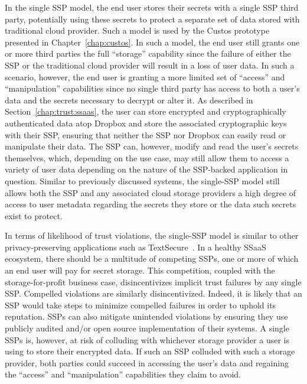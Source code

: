 In the single SSP model, the end user stores their secrets with a
single SSP third party, potentially using these secrets to protect a
separate set of data stored with traditional cloud provider. Such a
model is used by the Custos prototype presented in
Chapter~\ref{chap:custos}. In such a model, the end user still grants
one or more third parties the full ``storage'' capability since the
failure of either the SSP or the traditional cloud provider will
result in a loss of user data. In such a scenario, however, the end
user is granting a more limited set of ``access'' and ``manipulation''
capabilities since no single third party has access to both a user's
data and the secrets necessary to decrypt or alter it. As described in
Section~\ref{chap:trust:ssaas}, the user can store encrypted and
cryptographically authenticated data atop Dropbox and store the
associated cryptographic keys with their SSP, ensuring that neither
the SSP nor Dropbox can easily read or manipulate their data. The SSP
can, however, modify and read the user's secrets themselves, which,
depending on the use case, may still allow them to access a variety of
user data depending on the nature of the SSP-backed application in
question. Similar to previously discussed systems, the single-SSP
model still allows both the SSP and any associated cloud storage
providers a high degree of access to user metadata regarding the
secrets they store or the data such secrets exist to protect.

In terms of likelihood of trust violations, the single-SSP model is
similar to other privacy-preserving applications such as
TextSecure~\cite{frosch2014}. In a healthy SSaaS ecosystem, there
should be a multitude of competing SSPs, one or more of which an end
user will pay for secret storage. This competition, coupled with the
storage-for-profit business case, disincentivizes implicit trust
failures by any single SSP. Compelled violations are similarly
disincentivized. Indeed, it is likely that an SSP would take steps to
minimize compelled failures in order to uphold its reputation. SSPs
can also mitigate unintended violations by ensuring they use publicly
audited and/or open source implementation of their systems. A single
SSPs is, however, at risk of colluding with whichever storage provider
a user is using to store their encrypted data. If such an SSP colluded
with such a storage provider, both parties could succeed in accessing
the user's data and regaining the ``access'' and ``manipulation''
capabilities they claim to avoid.

